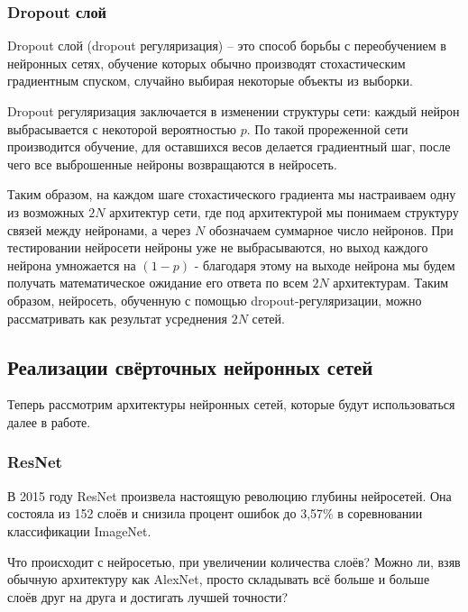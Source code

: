 \subsubsection{Dropout слой} \label{dropout_rev}
Dropout слой (dropout регуляризация)\cite{dropout} -- это способ борьбы с переобучением в нейронных сетях, обучение которых обычно производят стохастическим градиентным спуском, случайно выбирая некоторые объекты из выборки. 

Dropout регуляризация заключается в изменении структуры сети: каждый нейрон выбрасывается с некоторой вероятностью $p$. По такой прореженной сети производится обучение, для оставшихся весов делается градиентный шаг, после чего все выброшенные нейроны возвращаются в нейросеть.

Таким образом, на каждом шаге стохастического градиента мы настраиваем одну из возможных $2N$ архитектур сети, где под архитектурой мы понимаем структуру связей между нейронами, а через $N$ обозначаем суммарное число нейронов. При тестировании нейросети нейроны уже не выбрасываются, но выход каждого нейрона умножается на $(1 - p)$ - благодаря этому на выходе нейрона мы будем получать математическое ожидание его ответа по всем $2N$ архитектурам. Таким образом, нейросеть, обученную с помощью dropout-регуляризации, можно рассматривать как результат усреднения $2N$ сетей.

\subsection{Реализации свёрточных нейронных сетей} \label{nn_archs_lit}
Теперь рассмотрим архитектуры нейронных сетей, которые будут использоваться далее в работе.

\subsubsection{ResNet} \label{resnet_rev}

В 2015 году ResNet произвела настоящую революцию глубины нейросетей. Она состояла из 152 слоёв и снизила процент ошибок до 3,57\%\cite{resnet} в соревновании классификации ImageNet.

Что происходит с нейросетью, при увеличении количества слоёв? Можно ли, взяв обычную архитектуру как AlexNet, просто складывать всё больше и больше слоёв друг на друга и достигать лучшей точности? 


